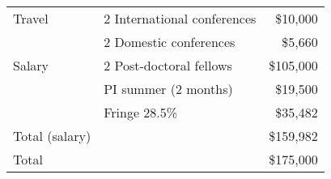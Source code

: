 \begin{center}
\begin{tabular}{llr}
\hline
\hline
Travel & 2 International conferences	&	  \$10,000 \\
&2 Domestic conferences	&	 \$5,660\\
\hline
Salary & 2 Post-doctoral fellows  		&	\$105,000\\
& PI summer (2 months)	&\$19,500\\
& Fringe  28.5\%	&	\$35,482\\
\hline
	Total (salary)	&&	\$159,982\\
\hline
\hline
	Total	   &&         \$175,000\\
\end{tabular}
\end{center}


